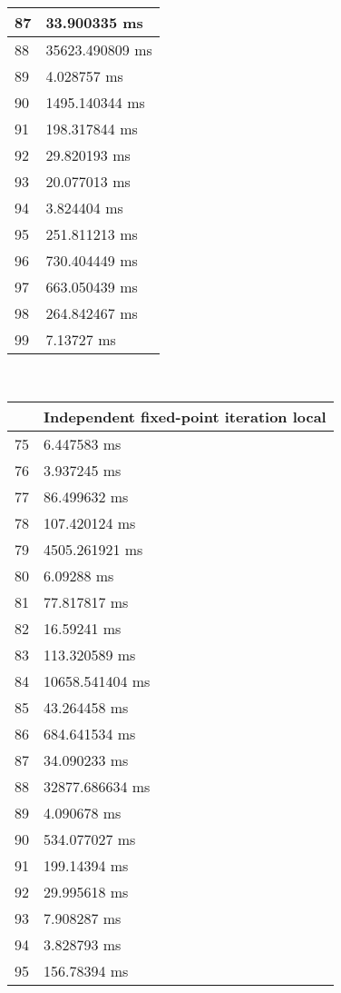 \begin{multicols}{2}
\begin{tabular}{|l|l|}
		87 & 33.900335 ms \\ \hline
		88 & 35623.490809 ms \\ \hline
		89 & 4.028757 ms \\ \hline
		90 & 1495.140344 ms \\ \hline
		91 & 198.317844 ms \\ \hline
		92 & 29.820193 ms \\ \hline
		93 & 20.077013 ms \\ \hline
		94 & 3.824404 ms \\ \hline
		95 & 251.811213 ms \\ \hline
		96 & 730.404449 ms \\ \hline
		97 & 663.050439 ms \\ \hline
		98 & 264.842467 ms \\ \hline
		99 & 7.13727 ms \\ \hline
	\end{tabular}\\
	\begin{tabular}{|l|l|}
		\hline
		& Independent fixed-point iteration local \\ \hline
		75 & 6.447583 ms \\ \hline
		76 & 3.937245 ms \\ \hline
		77 & 86.499632 ms \\ \hline
		78 & 107.420124 ms \\ \hline
		79 & 4505.261921 ms \\ \hline
		80 & 6.09288 ms \\ \hline
		81 & 77.817817 ms \\ \hline
		82 & 16.59241 ms \\ \hline
		83 & 113.320589 ms \\ \hline
		84 & 10658.541404 ms \\ \hline
		85 & 43.264458 ms \\ \hline
		86 & 684.641534 ms \\ \hline
		87 & 34.090233 ms \\ \hline
		88 & 32877.686634 ms \\ \hline
		89 & 4.090678 ms \\ \hline
		90 & 534.077027 ms \\ \hline
		91 & 199.14394 ms \\ \hline
		92 & 29.995618 ms \\ \hline
		93 & 7.908287 ms \\ \hline
		94 & 3.828793 ms \\ \hline
		95 & 156.78394 ms \\ \hline

\end{tabular}
\end{multicols}
